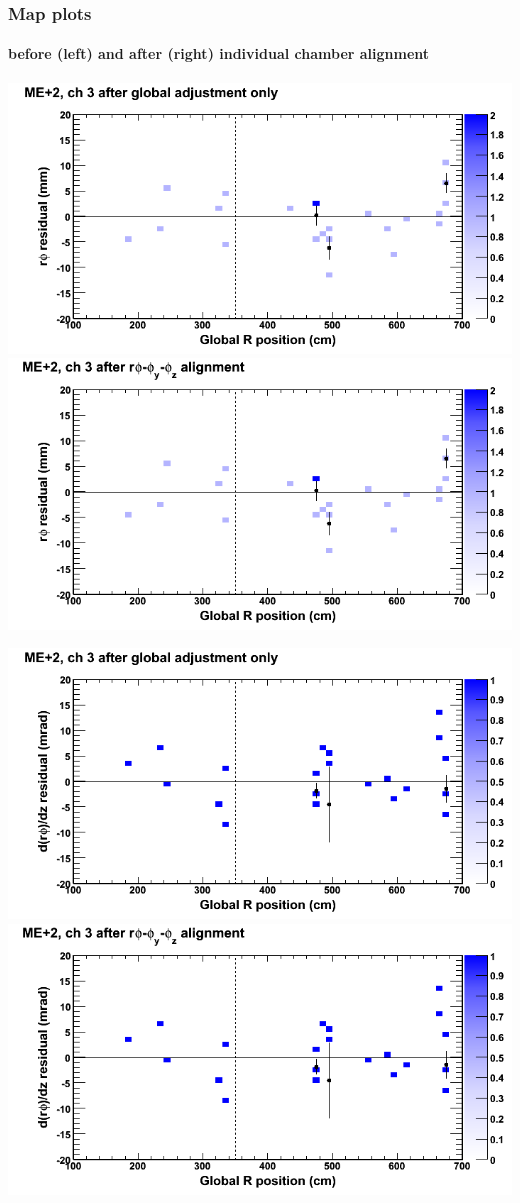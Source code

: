 \documentclass[compress]{beamer}
\begin{document}
\begin{frame}
\frametitle{Map plots}
\framesubtitle{before (left) and after (right) individual chamber alignment}
\includegraphics[width=0.5\linewidth]{ringmapplots_3dof/before_CSCvsr_mep2ch03_x.png} \includegraphics[width=0.5\linewidth]{ringmapplots_3dof/after_CSCvsr_mep2ch03_x.png}

\includegraphics[width=0.5\linewidth]{ringmapplots_3dof/before_CSCvsr_mep2ch03_dxdz.png} \includegraphics[width=0.5\linewidth]{ringmapplots_3dof/after_CSCvsr_mep2ch03_dxdz.png}
\end{frame}
\end{document}

